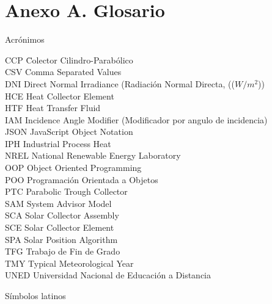 \chapter* {Anexo A. Glosario}

Acrónimos

\begin{tabbing}	
CCP \quad\quad\quad\quad\quad\= Colector Cilindro-Parabólico  \\
CSV \> Comma Separated Values \\
DNI \> Direct Normal Irradiance (Radiación Normal Directa, (($W/m^2$)) \\
HCE \> Heat Collector Element \\
HTF \> Heat Transfer Fluid \\
IAM \> Incidence Angle Modifier (Modificador por angulo de incidencia) \\
JSON \> JavaScript Object Notation \\
IPH \> Industrial Process Heat \\
NREL \> National Renewable Energy Laboratory \\
OOP \> Object Oriented Programming \\
POO  \> Programación Orientada a Objetos \\
PTC \> Parabolic Trough Collector \\
SAM\> System Advisor Model \\
SCA \> Solar Collector Assembly\\
SCE \> Solar Collector Element \\
SPA \> Solar Position Algorithm \\
TFG	\>Trabajo de Fin de Grado \\
TMY \> Typical Meteorological Year \\
UNED \> Universidad Nacional de Educación a Distancia \\
\end{tabbing}


Símbolos latinos

